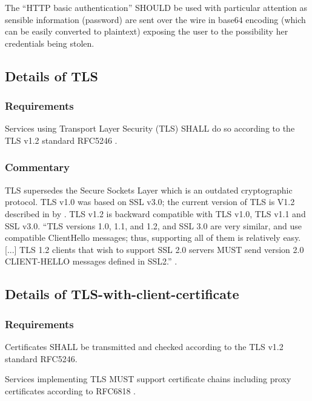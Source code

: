 \documentclass[11pt,a4paper]{ivoa}
\begin{document}
The ``HTTP basic authentication'' SHOULD be used with particular
attention as sensible
information (password) are sent over the wire in base64 encoding (which
can be easily converted to plaintext) exposing
the user to the possibility her credentials being stolen.

\subsection{Details of TLS}
\subsubsection{Requirements}
Services using Transport Layer Security (TLS) SHALL do so according to
the TLS v1.2 standard RFC5246 \citep{std:RFC5246}.

\subsubsection{Commentary}
TLS supersedes the Secure Sockets Layer which is an outdated
cryptographic protocol.
TLS v1.0 was based on SSL v3.0; the current version of TLS is V1.2
described in by \citet{std:RFC5246}.
TLS v1.2 is backward compatible with TLS v1.0, TLS v1.1 and SSL v3.0.
``TLS versions 1.0, 1.1, and 1.2, and SSL 3.0 are very similar, and use
compatible ClientHello messages;
thus, supporting all of them is relatively easy.[...] TLS 1.2 clients
that wish to support SSL 2.0 servers MUST
send  version 2.0 CLIENT-HELLO messages defined in SSL2.''
\citep{std:RFC5246}.

\subsection{Details of TLS-with-client-certificate}
\subsubsection{Requirements}
Certificates SHALL be transmitted and checked according to the TLS v1.2
standard RFC5246.

Services implementing TLS MUST support certificate chains including
proxy certificates according to RFC6818  \citep{std:RFC6818}.
\end{document}
